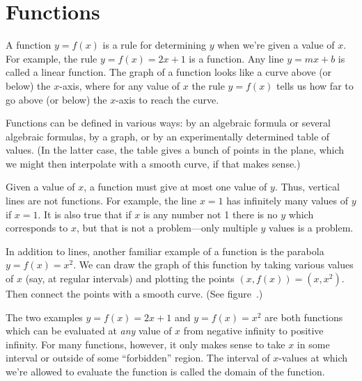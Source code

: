 \section{Functions}{}{}
\label{sec:functions}

A {\dfont function} $y=f(x)$ is a rule for determining
$y$ when we're given a value of $x$.  For example, the rule
$y=f(x)=2x+1$ is a function.  Any line $y=mx+b$ is called a {\dfont
linear} function.  The graph of a function
looks like a curve above (or below) the $x$-axis, where for any value
of $x$ the rule $y=f(x)$ tells us how far to go above (or below) the
$x$-axis to reach the curve.

Functions can be defined in various ways: by an algebraic formula or several
algebraic formulas, by
a graph, or by an experimentally determined table of values.  (In the latter
case, the table gives a bunch of points in the plane, which we might then
interpolate with a smooth curve, if that makes sense.)

Given a value of $x$, a function must give
at most one value of $y$.  Thus, vertical lines are not functions.  For
example, the line $x=1$ has infinitely many values of $y$ if $x=1$. It
is also true that 
if $x$ is any number not 1 there is no $y$ which corresponds to $x$,
but that is not a problem---only multiple $y$ values is a problem.

In addition to lines, another familiar example of a  
function is the parabola $y=f(x)=x^2$.  We can draw the graph of this
function by taking various values of $x$ (say, at regular intervals) and
plotting the points $(x,f(x))=(x,x^2)$.  Then connect the points with a
smooth curve.  (See figure~.)

The two examples $y=f(x)=2x+1$ and $y=f(x)=x^2$ are both functions which
can be evaluated at {\it any} value of $x$ from negative infinity to
positive infinity.  For many functions, however, it only makes sense to
take $x$ in some interval or outside of some ``forbidden'' region.  The
interval of $x$-values at which we're allowed to evaluate the function is
called the {\dfont domain} of the function.

